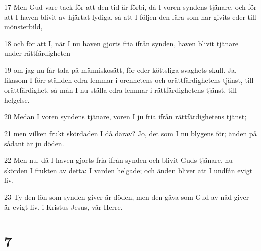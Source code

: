 \par 17 Men Gud vare tack för att den tid är förbi, då I voren syndens tjänare, och för att I haven blivit av hjärtat lydiga, så att I följen den lära som har givits eder till mönsterbild,
\par 18 och för att I, när I nu haven gjorts fria ifrån synden, haven blivit tjänare under rättfärdigheten -
\par 19 om jag nu får tala på människosätt, för eder köttsliga svaghets skull. Ja, likasom I förr ställden edra lemmar i orenhetens och orättfärdighetens tjänst, till orättfärdighet, så mån I nu ställa edra lemmar i rättfärdighetens tjänst, till helgelse.
\par 20 Medan I voren syndens tjänare, voren I ju fria ifrån rättfärdighetens tjänst;
\par 21 men vilken frukt skördaden I då därav? Jo, det som I nu blygens för; änden på sådant är ju döden.
\par 22 Men nu, då I haven gjorts fria ifrån synden och blivit Guds tjänare, nu skörden I frukten av detta: I varden helgade; och änden bliver att I undfån evigt liv.
\par 23 Ty den lön som synden giver är döden, men den gåva som Gud av nåd giver är evigt liv, i Kristus Jesus, vår Herre.

\chapter{7}

